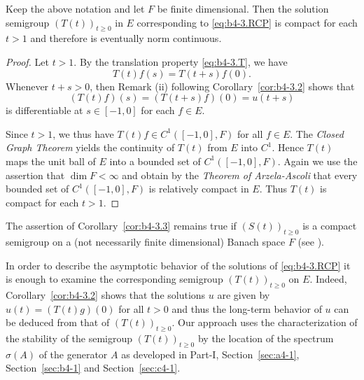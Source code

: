 \begin{corollary}\label{cor:b4-3.3}
	Keep the above notation and let $F$ be finite dimensional. 
    Then the solution semigroup $(T(t))_{t \geq 0}$ in $E$ corresponding to \eqref{eq:b4-3.RCP} is compact for each $t > 1$ and therefore is eventually norm continuous.
\end{corollary}
\begin{proof} 
Let $t > 1$. 
By the translation property \eqref{eq:b4-3.T}, we have 
\[%
T(t)f(s) = T(t+s)f(0) .
\] 
Whenever $t + s > 0$, then Remark (ii) following Corollary~\ref{cor:b4-3.2} shows that 
\[%
(T(t)f)(s) = (T(t+s)f)(0) = u(t+s)
\]
is differentiable 
at $s \in [-1,0]$ for each $f \in E$.

Since $t > 1$, we thus have $T(t)f \in C^1([-1,0],F)$ for all $f \in E$. 
The \emph{Closed Graph Theorem} yields the continuity of\/ $T(t)$ from $E$ into $C^1$. 
Hence $T(t)$ maps the unit ball of\/ $E$ into a bounded set of\/ $C^1([-1,0],F)$. 
Again we use the assertion that $\dim F < \infty$ and obtain by the \emph{Theorem of Arzela-Ascoli} that every bounded set of\/ $C^1([-1,0],F)$ is relatively compact in $E$. 
Thus $T(t)$ is compact for each $t > 1$.
\end{proof}
The assertion of Corollary~\ref{cor:b4-3.3} remains true if\/ $(S(t))_{t \geq 0}$ is a compact semigroup on a (not necessarily finite dimensional) Banach space $F$ (see \textcite{traviswebb:1974}).

In order to describe the asymptotic behavior of the solutions of \eqref{eq:b4-3.RCP} it is enough to examine the corresponding semigroup $(T(t))_{t \geq 0}$ on $E$. 
Indeed, Corollary~\ref{cor:b4-3.2} shows that the solutions $u$ are given by $u(t) = (T(t)g)(0)$ for all $t > 0$ and thus the long-term behavior of\/ $u$ can be deduced from that of\/ $(T(t))_{t \geq 0}$. 
Our approach uses the characterization of the stability of the semigroup $(T(t))_{t \geq 0}$ by the location of the spectrum $\sigma(A)$ of the generator $A$ as developed in Part-I, Section~\ref{sec:a4-1},  Section~\ref{sec:b4-1} and Section~\ref{sec:c4-1}.

